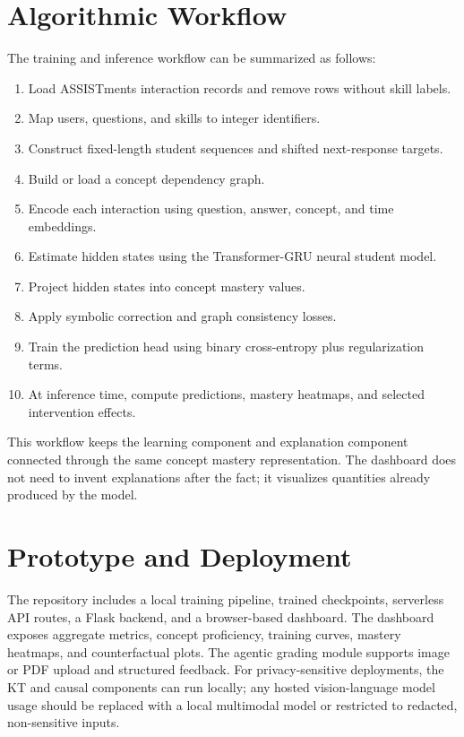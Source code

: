 \documentclass[conference]{IEEEtran}
\begin{document}
\section{Algorithmic Workflow}
The training and inference workflow can be summarized as follows:
\begin{enumerate}
    \item Load ASSISTments interaction records and remove rows without skill labels.
    \item Map users, questions, and skills to integer identifiers.
    \item Construct fixed-length student sequences and shifted next-response targets.
    \item Build or load a concept dependency graph.
    \item Encode each interaction using question, answer, concept, and time embeddings.
    \item Estimate hidden states using the Transformer-GRU neural student model.
    \item Project hidden states into concept mastery values.
    \item Apply symbolic correction and graph consistency losses.
    \item Train the prediction head using binary cross-entropy plus regularization terms.
    \item At inference time, compute predictions, mastery heatmaps, and selected intervention effects.
\end{enumerate}

This workflow keeps the learning component and explanation component connected through the same concept mastery representation. The dashboard does not need to invent explanations after the fact; it visualizes quantities already produced by the model.

\section{Prototype and Deployment}
The repository includes a local training pipeline, trained checkpoints, serverless API routes, a Flask backend, and a browser-based dashboard. The dashboard exposes aggregate metrics, concept proficiency, training curves, mastery heatmaps, and counterfactual plots. The agentic grading module supports image or PDF upload and structured feedback. For privacy-sensitive deployments, the KT and causal components can run locally; any hosted vision-language model usage should be replaced with a local multimodal model or restricted to redacted, non-sensitive inputs.
\end{document}
